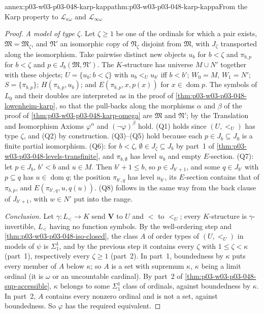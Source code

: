 \begin{annexitem}{annex:p03-w03-p03-048-karp-kappa}{thm:p03-w03-p03-048-karp-kappa}{From the Karp property to \(\mathcal L_{\kappa\omega}\) and \(\mathcal L_{\infty\omega}\)}
\begin{proof}
\emph{A model of type \(\zeta\).}  Let \(\zeta\geq1\) be one of the
ordinals for which a pair exists, \(\mathfrak M=\mathfrak M_\zeta\), and
\(\mathfrak N'\) an isomorphic copy of \(\mathfrak N_\zeta\) disjoint from
\(\mathfrak M\), with \(J_\zeta\) transported along the isomorphism.  Take
pairwise distinct new objects \(u_b\) for \(b<\zeta\) and \(\pi_{b,p}\) for
\(b<\zeta\) and \(p\in J_b(\mathfrak M,\mathfrak N')\).  The
\(K\)-structure has universe \(M\cup N'\) together with these objects;
\(U=\{u_b:b<\zeta\}\) with \(u_b<_Uu_{b'}\) iff \(b<b'\);
\(W_0=M\), \(W_1=N'\); \(S=\{\pi_{b,p}\}\); \(H(\pi_{b,p},u_b)\); and
\(E(\pi_{b,p},x,p(x))\) for \(x\in\operatorname{dom}p\).  The symbols of
\(L_0\) and their doubles are interpreted as in the proof of
\cref{thm:p03-w03-p03-048-lowenheim-karp}, so that the pull-backs along
the morphisms \(\alpha\) and \(\beta\) of the proof of
\cref{thm:p03-w03-p03-048-karp-omega} are \(\mathfrak M\) and \(\mathfrak N'\); by the
Translation and Isomorphism Axioms \(\varphi^{\alpha}\) and
\((\neg\varphi)^{\beta}\) hold.  (Q1) holds since \((U,<_U)\) has type
\(\zeta\), and (Q2) by construction.  (Q3)--(Q5) hold because each
\(p\in J_b\subseteq J_0\) is a finite partial isomorphism.  (Q6): for
\(b<\zeta\), \(\emptyset\in J_\zeta\subseteq J_b\) by part~1 of
\cref{thm:p03-w03-p03-048-levels-transfinite}, and \(\pi_{b,\emptyset}\) has
level \(u_b\) and empty \(E\)-section.  (Q7): let \(p\in J_b\), \(b'<b\) and
\(u\in M\).  Then \(b'+1\leq b\), so \(p\in J_{b'+1}\), and some \(q\in
J_{b'}\) with \(p\subseteq q\) has \(u\in\operatorname{dom}q\); the position
\(\pi_{b',q}\) has level \(u_{b'}\), its \(E\)-section contains that of
\(\pi_{b,p}\), and \(E(\pi_{b',q},u,q(u))\).  (Q8) follows in the same way
from the back clause of \(J_{b'+1}\), with \(w\in N'\) put into the range.

\emph{Conclusion.}  Let \(\gamma:L_{<}\to K\) send \(\mathbf V\) to \(U\) and
\(<\) to \(<_U\); every \(K\)-structure is \(\gamma\)-invertible, \(L_{<}\)
having no function symbols.  By the well-ordering step and
\cref{thm:p03-w03-p03-048-iso-closed}, the class \(A\) of order types of
\((U,<_U)\) in models of \(\psi\) is \(\Sigma^1_1\), and by the previous step
it contains every \(\zeta\) with \(1\leq\zeta<\kappa\) (part~1),
respectively every \(\zeta\geq1\) (part~2).  In part~1, boundedness by
\(\kappa\) puts every member of \(A\) below \(\kappa\); so \(A\) is a set
with supremum \(\kappa\), \(\kappa\) being a limit ordinal (it is
\(\omega\) or an uncountable cardinal).  By part~2 of
\cref{thm:p03-w03-p03-048-sup-accessible}, \(\kappa\) belongs to some
\(\Sigma^1_1\) class of ordinals, against boundedness by \(\kappa\).  In
part~2, \(A\) contains every nonzero ordinal and is not a set, against
boundedness.  So \(\varphi\) has the required equivalent.
\end{proof}
\end{annexitem}

